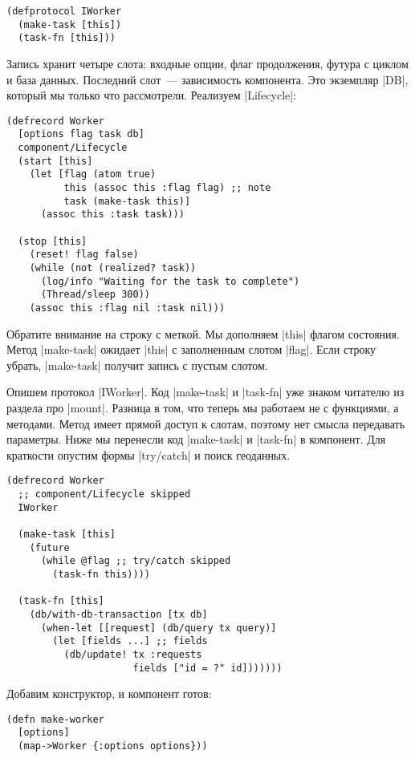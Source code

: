 \begin{verbatim}
(defprotocol IWorker
  (make-task [this])
  (task-fn [this]))
\end{verbatim}

Запись хранит четыре слота: входные опции, флаг продолжения, футура с циклом и
база данных. Последний слот~--- зависимость компонента. Это экземпляр
\spverb|DB|, который мы только что рассмотрели. Реализуем \spverb|Lifecycle|:


\begin{verbatim}
(defrecord Worker
  [options flag task db]
  component/Lifecycle
  (start [this]
    (let [flag (atom true)
          this (assoc this :flag flag) ;; note
          task (make-task this)]
      (assoc this :task task)))

  (stop [this]
    (reset! flag false)
    (while (not (realized? task))
      (log/info "Waiting for the task to complete")
      (Thread/sleep 300))
    (assoc this :flag nil :task nil)))
\end{verbatim}

Обратите внимание на строку с меткой. Мы дополняем \spverb|this| флагом %
состояния. Метод \spverb|make-task| ожидает \spverb|this| с заполненным слотом
\spverb|flag|. Если строку убрать, \spverb|make-task| получит запись с пустым
слотом.

Опишем протокол \spverb|IWorker|. Код \spverb|make-task| и \spverb|task-fn| уже
знаком читателю из раздела про \spverb|mount|. Разница в том, что теперь мы
работаем не с функциями, а методами. Метод имеет прямой доступ к слотам, поэтому
нет смысла передавать параметры. Ниже мы перенесли код \spverb|make-task| и
\spverb|task-fn| в компонент. Для краткости опустим формы \spverb|try/catch| и
поиск геоданных.

\begin{verbatim}
(defrecord Worker
  ;; component/Lifecycle skipped
  IWorker

  (make-task [this]
    (future
      (while @flag ;; try/catch skipped
        (task-fn this))))

  (task-fn [this]
    (db/with-db-transaction [tx db]
      (when-let [[request] (db/query tx query)]
        (let [fields ...] ;; fields
          (db/update! tx :requests
                      fields ["id = ?" id]))))))
\end{verbatim}

Добавим конструктор, и компонент готов:

\begin{verbatim}
(defn make-worker
  [options]
  (map->Worker {:options options}))
\end{verbatim}

